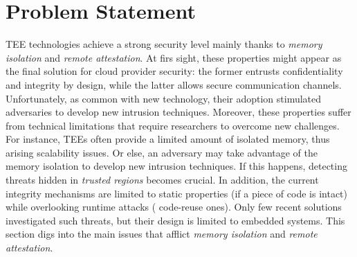 %

\section{Problem Statement}

TEE technologies achieve a strong security level mainly thanks to
\emph{memory isolation} and \emph{remote attestation}.
At firs sight, these properties might appear as the final solution for 
cloud provider security: the former entrusts confidentiality and integrity by 
design, while the latter allows secure communication channels.
Unfortunately, as common with new technology, their adoption stimulated 
adversaries to develop new intrusion techniques.
Moreover, these properties suffer from technical limitations that require 
researchers to overcome new challenges.
For instance, TEEs often provide a limited amount of isolated memory, thus 
arising scalability issues.
Or else, an adversary may take advantage of the memory isolation to develop new 
intrusion techniques.
If this happens, detecting threats hidden in \emph{trusted regions} becomes 
crucial.
In addition, the current integrity mechanisms are limited to static properties 
(\eg if a piece of code is intact) while overlooking runtime attacks (\eg 
code-reuse ones).
Only few recent solutions investigated such threats, but their design is 
limited to embedded systems.
This section digs into the main issues that afflict \emph{memory 
isolation} and \emph{remote attestation}.

